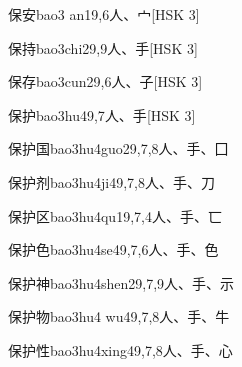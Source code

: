 \begin{entry}{保安}{bao3 an1}{9,6}{⼈、⼧}[HSK 3]
\end{entry}

\begin{entry}{保持}{bao3chi2}{9,9}{⼈、⼿}[HSK 3]
\end{entry}

\begin{entry}{保存}{bao3cun2}{9,6}{⼈、⼦}[HSK 3]
\end{entry}

\begin{entry}{保护}{bao3hu4}{9,7}{⼈、⼿}[HSK 3]
\end{entry}

\begin{entry}{保护国}{bao3hu4guo2}{9,7,8}{⼈、⼿、⼞}
\end{entry}

\begin{entry}{保护剂}{bao3hu4ji4}{9,7,8}{⼈、⼿、⼑}
\end{entry}

\begin{entry}{保护区}{bao3hu4qu1}{9,7,4}{⼈、⼿、⼖}
\end{entry}

\begin{entry}{保护色}{bao3hu4se4}{9,7,6}{⼈、⼿、⾊}
\end{entry}

\begin{entry}{保护神}{bao3hu4shen2}{9,7,9}{⼈、⼿、⽰}
\end{entry}

\begin{entry}{保护物}{bao3hu4 wu4}{9,7,8}{⼈、⼿、⽜}
\end{entry}

\begin{entry}{保护性}{bao3hu4xing4}{9,7,8}{⼈、⼿、⼼}
\end{entry}

